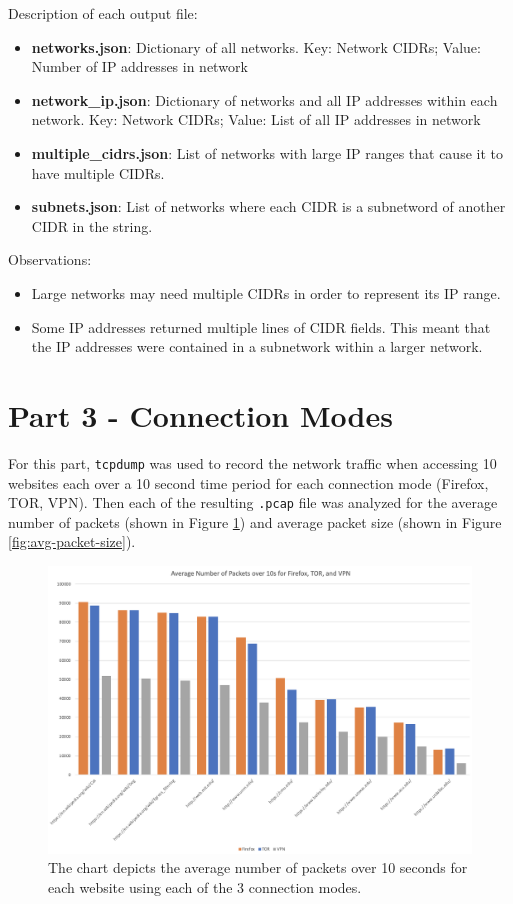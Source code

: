 \documentclass[11pt]{article}
\begin{document}
\noindent Description of each output file:
\begin{itemize}
\item\textbf{networks.json}: Dictionary of all networks. Key: Network CIDRs; Value: Number of IP addresses in network

\item\textbf{network\_ip.json}: Dictionary of networks and all IP addresses within each network. Key: Network CIDRs; Value: List of all IP addresses in network

\item\textbf{multiple\_cidrs.json}: List of networks with large IP ranges that cause it to have multiple CIDRs.

\item\textbf{subnets.json}: List of networks where each CIDR is a subnetword of another CIDR in the string.
\end{itemize}

\noindent Observations:
\begin{itemize}
  \item Large networks may need multiple CIDRs in order to represent its IP range.
  \item Some IP addresses returned multiple lines of CIDR fields. This meant that the IP addresses were contained in a subnetwork within a larger network.
\end{itemize}

\newpage
\section*{Part 3 - Connection Modes}
\label{sec:part-3}
For this part, \verb|tcpdump| was used to record the network traffic when accessing 10 websites each over a 10 second time period for each connection mode (Firefox, TOR, VPN).
Then each of the resulting \verb|.pcap| file was analyzed for the average number of packets (shown in Figure \ref{fig:avg-number-packets})
and average packet size (shown in Figure \ref{fig:avg-packet-size}).

\begin{figure}[h]
  \centering
  \includegraphics[width=.9\linewidth]{./avg-number-packets.png}
  \caption{\label{fig:avg-number-packets}
  The chart depicts the average number of packets over 10 seconds for each website using each of the 3 connection modes.}
\end{figure}
\end{document}
